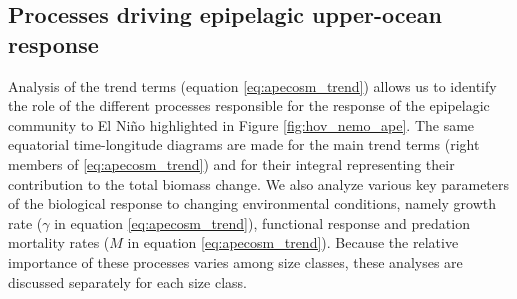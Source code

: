\subsection{Processes driving epipelagic upper-ocean response}

Analysis of the trend terms (equation \ref{eq:apecosm_trend}) allows us to identify the role of the different processes responsible for the response of the epipelagic community to El Niño highlighted in Figure \ref{fig:hov_nemo_ape}. The same equatorial time-longitude diagrams are made for the main trend terms (right members of \ref{eq:apecosm_trend}) and for their integral representing their contribution to the total biomass change. We also analyze various key parameters of the biological response to changing environmental conditions, namely growth rate ($\gamma$ in equation \ref{eq:apecosm_trend}), functional response and predation mortality rates ($M$ in equation \ref{eq:apecosm_trend}). Because the relative importance of these processes varies among size classes, these analyses are discussed separately for each size class.

